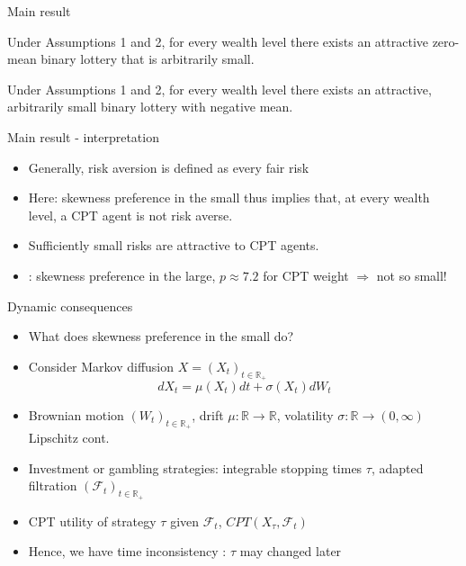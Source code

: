 \begin{frame}{Main result}
    \begin{theorem}
        Under Assumptions 1 and 2, for every wealth level there exists an attractive zero-mean binary lottery that is arbitrarily small.
	\end{theorem}

    \begin{corollary}
        Under Assumptions 1 and 2, for every wealth level there exists an attractive, arbitrarily small binary lottery with negative mean.
	\end{corollary}
\end{frame}

\begin{frame}{Main result - interpretation}
    \begin{itemize}
        \item Generally, risk aversion is defined as every fair risk\medskip
        \item Here: skewness preference in the small thus implies that, at every wealth level, a CPT agent is not risk averse.\medskip
        \item Sufficiently small risks are attractive to CPT agents.\medskip
        \item \citet{AzevedoGottlieb2012}: skewness preference in the large, $p\approx 7.2$ for CPT weight $\Rightarrow$ not so small!\medskip
	\end{itemize}
\end{frame}

\begin{frame}{Dynamic consequences}
    \begin{itemize}
        \item What does skewness preference in the small do?\medskip
        \item Consider Markov diffusion $ X= (X_t)_{t \in \mathbb{R}_+ }$
        \[dX_t = \mu(X_t)dt + \sigma (X_t)dW_t\]
        \item Brownian motion $(W_t)_{t \in \mathbb{R}_+ }$, drift $\mu:\mathbb{R} \rightarrow \mathbb{R}$, volatility $\sigma: \mathbb{R}  \rightarrow (0,\infty)$ Lipschitz cont.\medskip
        \item Investment or gambling strategies: integrable stopping times $\tau$, adapted filtration $(\mathcal{F} _t)_{t \in \mathbb{R}_+ }$\medskip
        \item CPT utility of strategy $\tau$ given $\mathcal{F} _t$, $CPT(X_\tau,\mathcal{F}_t)$\medskip
        \item Hence, we have  time inconsistency \citep{Barberis2012a}: $\tau$ may changed later\medskip
       	\end{itemize}
\end{frame}


